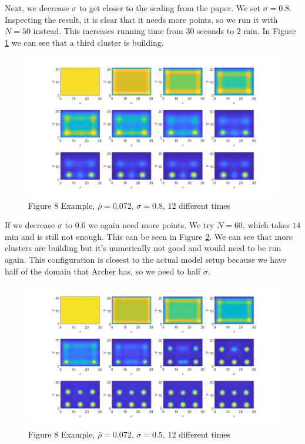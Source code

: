 \documentclass[11pt, a4paper]{article}
\theoremstyle{definition}
\begin{document}
	Next, we decrease $\sigma$ to get closer to the scaling from the paper. We set $\sigma = 0.8$. Inspecting the result, it is clear that it needs more points, so we run it with $N = 50$ instead. This increases running time from $30$ seconds to $2$ min. In Figure \ref{F2} we can see that a third cluster is building. 
	\begin{figure}[h]
		\centering
		\includegraphics[scale=0.25]{Ex8F2.png}
		\caption{Figure 8 Example, $\bar \rho = 0.072$, $\sigma = 0.8$, $12$ different times} 
		\label{F2}
	\end{figure} 
	If we decrease $\sigma$ to $0.6$ we again need more points. We try $N = 60$, which takes $14$ min and is still not enough. This can be seen in Figure \ref{F3}. We can see that more clusters are building but it's numerically not good and would need to be run again. This configuration is closest to the actual model setup because we have half of the domain that Archer has, so we need to half $\sigma$.
	\begin{figure}[h]
		\centering
		\includegraphics[scale=0.25]{Ex8F3.png}
		\caption{Figure 8 Example, $\bar \rho = 0.072$, $\sigma = 0.5$, $12$ different times} 
		\label{F3}
	\end{figure} 
\end{document}
